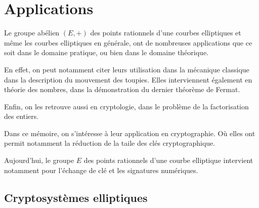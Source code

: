 \chapter{Applications}
Le groupe abélien $(E,+)$ des points rationnels d'une courbes elliptiques et même les courbes elliptiques en générale,
ont de nombreuses applications que ce soit dans le domaine pratique, ou bien dans le domaine
théorique.

En effet, on peut notamment citer leurs utilisation dans la mécanique classique dans la
description du mouvement des toupies. Elles interviennent également en théorie des nombres, dans la démonstration
du dernier théorème de Fermat.

Enfin, on les retrouve aussi en cryptologie, dans le problème de la factorisation des entiers.

Dans ce mémoire, on s'intéresse à leur application en cryptographie. Où elles ont
permit notamment la réduction de la taile des clés cryptographique.

Aujourd'hui, le groupe $E$ des points rationnels d'une courbe elliptique intervient notamment pour l'échange de clé
et les signatures numériques.

\section{Cryptosystèmes elliptiques}





